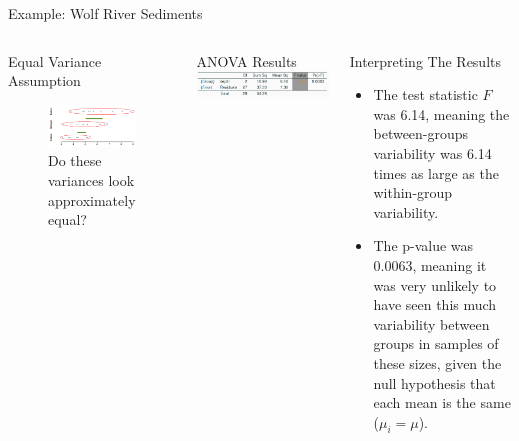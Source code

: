 \documentclass[
  ignorenonframetext,
]{beamer}
\providecommand{\tightlist}{%
  \setlength{\itemsep}{0pt}\setlength{\parskip}{0pt}}\usepackage{longtable,booktabs,array}
\begin{document}
\begin{frame}{Example: Wolf River Sediments}
\begin{columns}[T]
\begin{frame}{Equal Variance Assumption}
\label{equal-variance-assumption}
\begin{figure}[H]

{\centering \includegraphics{class30_files/mediabag/variance.png}

}

\caption{Do these variances look approximately equal?}

\end{figure}%
\end{frame}

\begin{frame}{ANOVA Results}
\label{anova-results}
\includegraphics{class30_files/mediabag/example-anova-output.png}
\end{frame}

\begin{frame}{Interpreting The Results}
\label{interpreting-the-results}
\begin{itemize}
\tightlist
\item
  The test statistic \(F\) was 6.14, meaning the between-groups
  variability was 6.14 times as large as the within-group variability.
\end{itemize}

\pause

\begin{itemize}
\tightlist
\item
  The p-value was 0.0063, meaning it was very unlikely to have seen this
  much variability between groups in samples of these sizes, given the
  null hypothesis that each mean is the same (\(\mu_i=\mu\)).
\end{itemize}


\end{frame}
\end{columns}
\end{frame}
\end{document}
